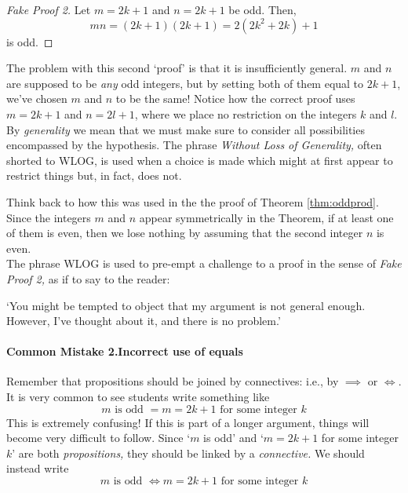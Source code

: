 \begin{proof}[Fake Proof 2]
Let $m=2k+1$ and $n=2k+1$ be odd. Then,
\[mn=(2k+1)(2k+1)=2(2k^2+2k)+1\]
is odd.
\end{proof}

\noindent The problem with this second `proof' is that it is insufficiently general. $m$ and $n$ are supposed to be \emph{any} odd integers, but by setting both of them equal to $2k+1$, we've chosen $m$ and $n$ to be the same! Notice how the correct proof uses $m=2k+1$ and $n=2l+1$, where we place no restriction on the integers $k$ and $l$.\\


\noindent By \emph{generality} we mean that we must make sure to consider all possibilities encompassed by the hypothesis. The phrase \emph{Without Loss of Generality,} often shorted to WLOG, is used when a choice is made which might at first appear to restrict things but, in fact, does not.

Think back to how this was used in the the proof of Theorem \ref{thm:oddprod}. Since the integers $m$ and $n$ appear symmetrically in the Theorem, if at least one of them is even, then we lose nothing by assuming that the second integer $n$ is even.\\

The phrase WLOG is used to pre-empt a challenge to a proof in the sense of \emph{Fake Proof 2,} as if to say to the reader:
\begin{center}
`You might be tempted to object that my argument is not general enough. However, I've thought about it, and there is no problem.'\\
\end{center}

\paragraph{Common Mistake 2.\quad Incorrect use of equals}

Remember that propositions should be joined by connectives: i.e., by $\implies$ or $\iff$. It is very common to see students write something like
\[\text{$m$ is odd $=m=2k+1$ for some integer $k$}\]
This is extremely confusing! If this is part of a longer argument, things will become very difficult to follow. Since `$m$ is odd' and `$m=2k+1$ for some integer $k$' are both \emph{propositions,} they should be linked by a \emph{connective.} We should instead write
\[\text{$m$ is odd $\iff m=2k+1$ for some integer $k$}\]

